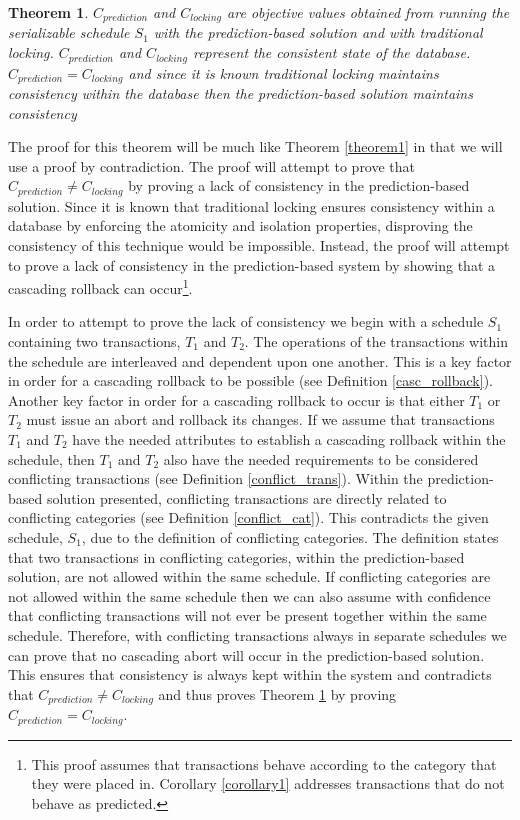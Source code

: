 \documentclass[conference]{IEEEtran}
\newtheorem{theorem}{Theorem}
\begin{document}
\begin{theorem}
\label{theorem2}
 $C_{prediction}$ and $C_{locking}$ are objective values obtained from running the serializable schedule $S_{1}$ with the prediction-based solution and with traditional locking. $C_{prediction}$ and $C_{locking}$ represent the consistent state of the database. $C_{prediction} = C_{locking}$ and since it is known traditional locking maintains consistency within the database then the prediction-based solution maintains consistency
\end{theorem}

The proof for this theorem will be much like Theorem \ref{theorem1} in that we will use a proof by contradiction. The proof will attempt to prove that $C_{prediction} \neq C_{locking}$ by proving a lack of consistency in the prediction-based solution. Since it is known that traditional locking ensures consistency within a database by enforcing the atomicity and isolation properties, disproving the consistency of this technique would be impossible. Instead, the proof will attempt to prove a lack of consistency in the prediction-based system by showing that a cascading rollback can occur\footnote{This proof assumes that transactions behave according to the category that they were placed in. Corollary \ref{corollary1} addresses transactions that do not behave as predicted.}.

In order to attempt to prove the lack of consistency we begin with a schedule $S_{1}$ containing two transactions, $T_{1}$ and $T_{2}$. The operations of the transactions within the schedule are interleaved and dependent upon one another. This is a key factor in order for a cascading rollback to be possible (see Definition \ref{casc_rollback}). Another key factor in order for a cascading rollback to occur is that either $T_{1}$ or $T_{2}$ must issue an abort and rollback its changes. If we assume that transactions $T_{1}$ and $T_{2}$ have the needed attributes to establish a cascading rollback within the schedule, then $T_{1}$ and $T_{2}$ also have the needed requirements to be considered conflicting transactions (see Definition \ref{conflict_trans}). Within the prediction-based solution presented, conflicting transactions are directly related to conflicting categories (see Definition \ref{conflict_cat}). This contradicts the given schedule, $S_{1}$, due to the definition of conflicting categories. The definition states that two transactions in conflicting categories, within the prediction-based solution, are not allowed within the same schedule. If conflicting categories are not allowed within the same schedule then we can also assume with confidence that conflicting transactions will not ever be present together within the same schedule. Therefore, with conflicting transactions always in separate schedules we can prove that no cascading abort will occur in the prediction-based solution. This ensures that consistency is always kept within the system and contradicts that $C_{prediction} \neq C_{locking}$ and thus proves Theorem \ref{theorem2} by proving $C_{prediction} = C_{locking}$.
\end{document}
